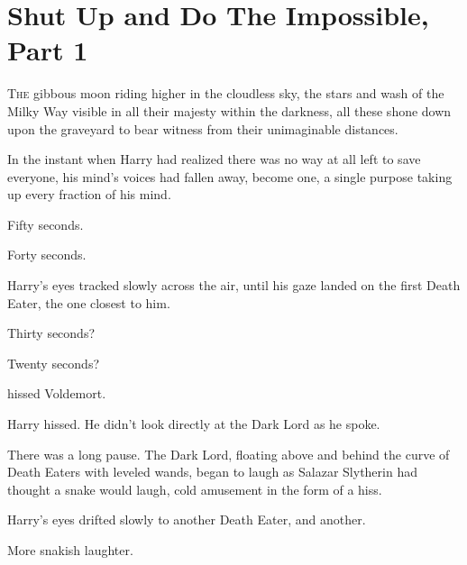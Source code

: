 \chapter{Shut Up and Do The Impossible, Part 1}

\lettrine{T}{he} gibbous moon
riding higher in the cloudless sky, the stars and wash of the Milky Way visible
in all their majesty within the darkness, all these shone down upon the
graveyard to bear witness from their unimaginable distances.

In the instant when Harry had realized there was no way at all left to save
everyone, his mind's voices had fallen away, become one, a single purpose
taking up every fraction of his mind.

Fifty seconds.

Forty seconds.

Harry's eyes tracked slowly across the air, until his gaze landed on the first
Death Eater, the one closest to him.

Thirty seconds?

Twenty seconds?

 hissed Voldemort.

 Harry hissed. He didn't
look directly at the Dark Lord as he spoke. 

There was a long pause. The Dark Lord, floating above and behind the curve of
Death Eaters with leveled wands, began to laugh as Salazar Slytherin had
thought a snake would laugh, cold amusement in the form of a hiss. 


Harry's eyes drifted slowly to another Death Eater, and another.

More snakish laughter. 

